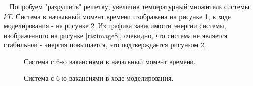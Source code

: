 \documentclass[14pt,a4paper,report]{ncc}
\begin{document}
\
\newpage
Попробуем "разрушить" решетку, увеличив температурный множитель системы $kT$. Система в начальный момент времени изображена на рисунке \ref{ris:image6}, в ходе моделирования - на рисунке \ref{ris:image7}. Из графика зависимости энергии системы, изображенного на рисунке \ref{ris:image8}, очевидно, что система не является стабильной - энергия повышается, это подтверждается рисунком \ref{ris:image7}.
\begin{figure}[h]
\caption{Система с 6-ю вакансиями в начальный момент времени.}
\label{ris:image6}
\end{figure}
\begin{figure}[h!]
\caption{Система с 6-ю вакансиями в ходе моделирования.}
\label{ris:image7}
\end{figure}
\end{document}
